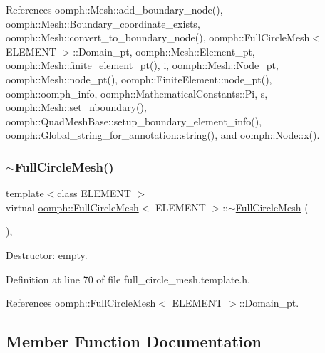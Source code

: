 References oomph\+::\+Mesh\+::add\+\_\+boundary\+\_\+node(), oomph\+::\+Mesh\+::\+Boundary\+\_\+coordinate\+\_\+exists, oomph\+::\+Mesh\+::convert\+\_\+to\+\_\+boundary\+\_\+node(), oomph\+::\+Full\+Circle\+Mesh$<$ E\+L\+E\+M\+E\+N\+T $>$\+::\+Domain\+\_\+pt, oomph\+::\+Mesh\+::\+Element\+\_\+pt, oomph\+::\+Mesh\+::finite\+\_\+element\+\_\+pt(), i, oomph\+::\+Mesh\+::\+Node\+\_\+pt, oomph\+::\+Mesh\+::node\+\_\+pt(), oomph\+::\+Finite\+Element\+::node\+\_\+pt(), oomph\+::oomph\+\_\+info, oomph\+::\+Mathematical\+Constants\+::\+Pi, s, oomph\+::\+Mesh\+::set\+\_\+nboundary(), oomph\+::\+Quad\+Mesh\+Base\+::setup\+\_\+boundary\+\_\+element\+\_\+info(), oomph\+::\+Global\+\_\+string\+\_\+for\+\_\+annotation\+::string(), and oomph\+::\+Node\+::x().

\mbox{\label{classoomph_1_1FullCircleMesh_a7acf128e8eeaefcd79b5b3cd5e9cbaa9}} 
\subsubsection{\texorpdfstring{$\sim$\+Full\+Circle\+Mesh()}{~FullCircleMesh()}}
{\footnotesize\ttfamily template$<$class E\+L\+E\+M\+E\+NT $>$ \\
virtual \hyperlink{classoomph_1_1FullCircleMesh}{oomph\+::\+Full\+Circle\+Mesh}$<$ E\+L\+E\+M\+E\+NT $>$\+::$\sim$\hyperlink{classoomph_1_1FullCircleMesh}{Full\+Circle\+Mesh} (\begin{DoxyParamCaption}{ }\end{DoxyParamCaption})\hspace{0.3cm}{\ttfamily [inline]}, {\ttfamily [virtual]}}



Destructor\+: empty. 



Definition at line 70 of file full\+\_\+circle\+\_\+mesh.\+template.\+h.



References oomph\+::\+Full\+Circle\+Mesh$<$ E\+L\+E\+M\+E\+N\+T $>$\+::\+Domain\+\_\+pt.



\subsection{Member Function Documentation}
\mbox{\label{classoomph_1_1FullCircleMesh_a0ee479af0a6562231d7a7d1c5533beb9}} 
